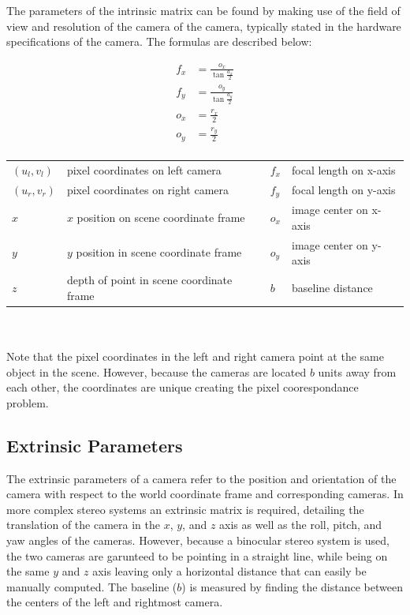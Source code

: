 \documentclass[11pt]{scrartcl}
\begin{document}
The parameters of the intrinsic matrix can be found by making use of the field of view 
and resolution of the camera of the camera, typically stated in the hardware specifications of the camera. The 
formulas are described below: 

\begin{theorem}

  \begin{align}
      f_x & = \displaystyle\frac{o_x}{\tan{\displaystyle\frac{a_x}{2}}} \\
    f_y & = \displaystyle\frac{o_y}{\tan{\displaystyle\frac{a_y}{2}}}  \\
    o_x & = \displaystyle\frac{r_x}{2} \\ 
    o_y & = \displaystyle\frac{r_y}{2} \\ 
  \end{align}

  \begin{figurekey}
    \begin{tabular}{llll}
      $(u_l,v_l)$ & pixel coordinates on left camera     & $f_x$ & focal length on x-axis \\
      $(u_r,v_r)$ & pixel coordinates on right camera   & $f_y$ & focal length on y-axis \\
      $x$     & $x$ position on scene coordinate frame  & $o_x$ & image center on x-axis \\
      $y$     & $y$ position in scene coordinate frame   & $o_y$ & image center on y-axis \\
        $z$     & depth of point in scene coordinate frame  &$b$ & baseline distance \\
    \end{tabular}
  \end{figurekey} \\ \\
    Note that the pixel coordinates in the left and right camera point at the same object in 
    the scene. However, because the cameras are located $b$ units away from each other, 
    the coordinates are unique creating the pixel coorespondance problem. 
\end{theorem}



\subsection{Extrinsic Parameters}

The extrinsic parameters of a camera refer to the position and orientation of the camera 
with respect to the world coordinate frame and corresponding cameras. In more complex 
stereo systems an extrinsic matrix is required, detailing the translation of the camera 
in the $x$, $y$, and $z$ axis as well as the roll, pitch, and yaw angles of the cameras. 
However, because a binocular stereo system is used, the two cameras are garunteed to 
be pointing in a straight line, while being on the same $y$ and $z$ axis leaving only 
a horizontal distance that can easily be manually computed. The baseline ($b$) is measured 
by finding the distance between the centers of the left and rightmost camera. 
\end{document}
